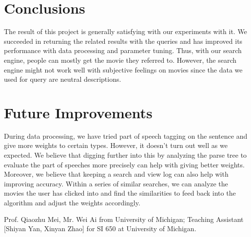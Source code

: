 \documentclass[sigconf,nonacm]{acmart}
\begin{document}
\section{Conclusions}

The result of this project is generally satisfying with our experiments with
it. We succeeded in returning the related results with the queries and has
improved its performance with data processing and parameter tuning. Thus,
with our search engine, people can mostly get the movie they referred to.
However, the search engine might not work well with subjective feelings on
movies since the data we used for query are neutral descriptions.

\section{Future Improvements}
During data processing, we have tried part of speech tagging on the sentence and give more weights to certain types. However, it doesn’t turn out well as we expected. We believe that digging further into this by analyzing the parse tree to evaluate the part of speeches more precisely can help with giving better weights.
Moreover, we believe that keeping a search and view log can also help with improving accuracy. Within a series of similar searches, we can analyze the movies the user has clicked into and find the similarities to feed back into the algorithm and adjust the weights accordingly.

\begin{acks}
  Prof. Qiaozhu Mei, Mr. Wei Ai from University of Michigan;
  Teaching Assistant [Shiyan Yan, Xinyan Zhao] for SI 650 at University of Michigan.
\end{acks}




 

\end{document}
